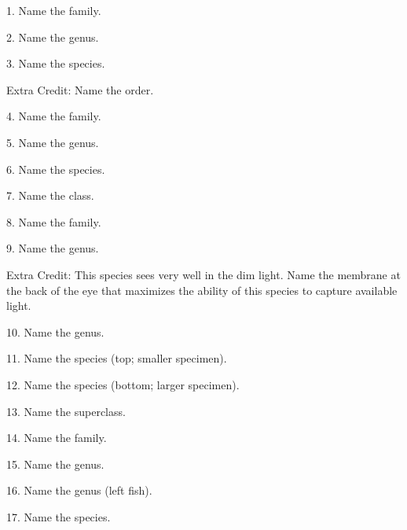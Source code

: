 \documentclass{article}
\begin{document}
{\Large 
1. Name the family.
\vspace{0.5\baselineskip}

2. Name the genus.
\vspace{0.5\baselineskip}

3. Name the species.
\vspace{0.5\baselineskip}

Extra Credit: Name the order.
\vspace{2\baselineskip}

%


4. Name the family.
\vspace{0.5\baselineskip}

5. Name the genus.
\vspace{0.5\baselineskip}

6. Name the species.
\vspace{2\baselineskip}
%


7. Name the class.
\vspace{0.5\baselineskip}

8. Name the family.
\vspace{0.5\baselineskip}

9. Name the genus.
\vspace{0.5\baselineskip}

Extra Credit: This species sees very well in the dim light. Name the membrane at the back of the eye that maximizes the ability of this species to capture available light.
\vspace{2\baselineskip}
%


10. Name the genus.
\vspace{0.5\baselineskip}

11. Name the species (top; smaller specimen).
\vspace{0.5\baselineskip}

12. Name the species (bottom; larger specimen).
\vspace{2\baselineskip}
%

%
13. Name the superclass.
\vspace{0.5\baselineskip}

14. Name the family.
\vspace{0.5\baselineskip}

15. Name the genus.
\vspace{2\baselineskip}
%

16. Name the genus (left fish).
\vspace{0.5\baselineskip}

17. Name the species.
\vspace{2\baselineskip}

}
\end{document}

